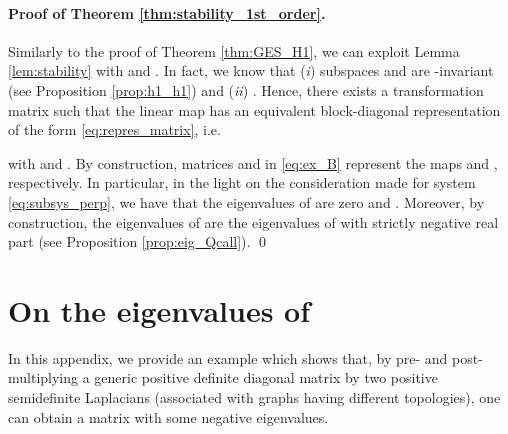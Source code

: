 \documentclass[a4paper]{article}
\theoremstyle{plain}
\begin{document}
\paragraph{Proof of Theorem \ref{thm:stability_1st_order}.}
Similarly to the proof of Theorem \ref{thm:GES_H1}, we can exploit Lemma \ref{lem:stability} with  and . In fact, we know that (\textit{i}) subspaces  and  are -invariant (see Proposition \ref{prop:h1_h1}) and (\textit{ii}) . Hence, there exists a transformation matrix  such that the linear map  has an equivalent block-diagonal representation of the form \eqref{eq:repres_matrix}, i.e. \vspace{3mm}

with  and .
By construction, matrices  and  in \eqref{eq:ex_B}
represent the maps  and , respectively. In particular, in the light on the consideration made for system
\eqref{eq:subsys_perp}, we have that the eigenvalues of  are
zero and . Moreover, by construction, the eigenvalues of
 are the  eigenvalues of  with strictly negative
real part (see Proposition \ref{prop:eig_Qcall}). \qed     \newpage
    \section{On the eigenvalues of }
\label{app:eig_Q}
In this appendix, we provide an example which shows that, by pre- and  post- multiplying a generic positive definite diagonal matrix by two positive semidefinite Laplacians (associated with graphs having different topologies), one can obtain a matrix with some negative eigenvalues. 
\end{document}
